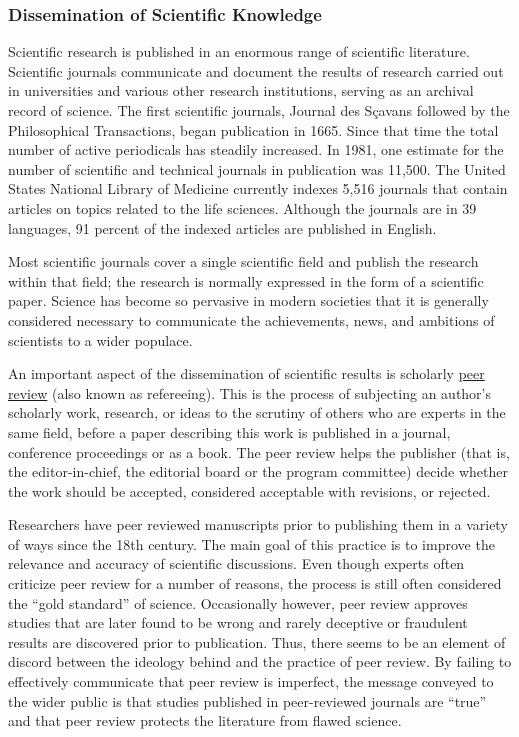 \documentclass[
]{article}
\begin{document}
\hypertarget{dissemination-of-scientific-knowledge}{%
\subsubsection{Dissemination of Scientific
Knowledge}\label{dissemination-of-scientific-knowledge}}

Scientific research is published in an enormous range of scientific
literature. Scientific journals communicate and document the results of
research carried out in universities and various other research
institutions, serving as an archival record of science. The first
scientific journals, Journal des Sçavans followed by the Philosophical
Transactions, began publication in 1665. Since that time the total
number of active periodicals has steadily increased. In 1981, one
estimate for the number of scientific and technical journals in
publication was 11,500. The United States National Library of Medicine
currently indexes 5,516 journals that contain articles on topics related
to the life sciences. Although the journals are in 39 languages, 91
percent of the indexed articles are published in English.

Most scientific journals cover a single scientific field and publish the
research within that field; the research is normally expressed in the
form of a scientific paper. Science has become so pervasive in modern
societies that it is generally considered necessary to communicate the
achievements, news, and ambitions of scientists to a wider populace.

An important aspect of the dissemination of scientific results is
scholarly \href{https://en.wikipedia.org/wiki/Peer_review}{peer review}
(also known as refereeing). This is the process of subjecting an
author's scholarly work, research, or ideas to the scrutiny of others
who are experts in the same field, before a paper describing this work
is published in a journal, conference proceedings or as a book. The peer
review helps the publisher (that is, the editor-in-chief, the editorial
board or the program committee) decide whether the work should be
accepted, considered acceptable with revisions, or rejected.

Researchers have peer reviewed manuscripts prior to publishing them in a
variety of ways since the 18th century. The main goal of this practice
is to improve the relevance and accuracy of scientific discussions. Even
though experts often criticize peer review for a number of reasons, the
process is still often considered the ``gold standard'' of science.
Occasionally however, peer review approves studies that are later found
to be wrong and rarely deceptive or fraudulent results are discovered
prior to publication. Thus, there seems to be an element of discord
between the ideology behind and the practice of peer review. By failing
to effectively communicate that peer review is imperfect, the message
conveyed to the wider public is that studies published in peer-reviewed
journals are ``true'' and that peer review protects the literature from
flawed science.
\end{document}
